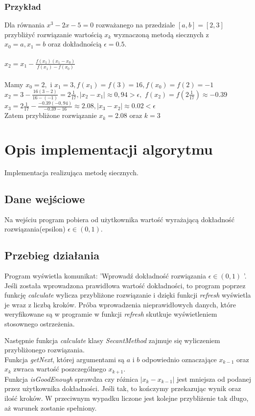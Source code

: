 \documentclass[12pt]{article}
\begin{document}
\subsubsection{Przykład}
Dla równania $x^3-2x-5=0$ rozważanego na przedziale $[a,b]=[2,3]$ przybliżyć rozwiązanie wartością $x_k$ wyznaczoną metodą siecznych z\\
$x_0=a, x_1=b$ oraz dokładnością $\epsilon = 0.5.$
\\ \\
$ x_2=x_1 - \frac{f(x_1)(x_1-x_{0})}{f(x_1)-f(x_{0})}$
\\ \\
 Mamy $ x_{0}=2,$ i $x_{1}=3, f(x_1)=f(3)=16, f(x_0)=f(2)=-1$ 
\\$x_2=3-\frac{16(3-2)}{16-(-1)}=2 \frac{1}{17}, |x_2 - x_1|\approx 0,94 > \epsilon,$
$f(x_2)=f(2 \frac{1}{17})\approx-0.39$ $x_3=2 \frac{1}{17}-\frac{-0.39(-0,94)}{-0.39-16}\approx2.08, |x_3 - x_2|\approx 0.02<\epsilon$
\\Zatem przybliżone rozwiązanie $x_k=2.08$ oraz $k=3$
\section{Opis implementacji algorytmu}
Implementacja realizująca metodę siecznych.
\subsection{Dane wejściowe}
Na wejściu program pobiera od użytkownika wartość wyrażającą dokładność rozwiązania(epsilon) $\epsilon \in(0,1).$ 



\subsection{Przebieg działania}
Program wyświetla komunikat: 'Wprowadź dokładność rozwiązania $\epsilon \in(0,1)$ '. Jeśli została wprowadzona prawidłowa wartość dokładności, to program poprzez funkcję \emph{calculate} wylicza przybliżone rozwiązanie i dzięki funkcji \emph{refresh} wyświetla je wraz z liczbą kroków.
Próba wprowadzenia nieprawidłowych danych, które weryfikowane są w programie w funkcji \emph{refresh} skutkuje wyświetleniem stosownego ostrzeżenia.
\par Następnie funkcja \emph{calculate} klasy \emph{SecantMethod} zajmuje się wyliczeniem przybliżonego rozwiązania.\\
Funkcja \emph{getNext}, której argumentami są $a$ i $b$ odpowiednio oznaczające $x_{k-1}$ oraz $x_{k}$ zwraca wartość poszczególnego $x_{k+1}$.
\\
Funkcja \emph{isGoodEnough} sprawdza czy różnica  $|x_k - x_{k-1}|$ jest mniejsza od podanej przez użytkownika dokładności. Jeśli tak, to kończymy przekazując wynik oraz ilość kroków. W przeciwnym wypadku liczone jest kolejne przybliżenie tak długo, aż warunek zostanie spełniony.
\end{document}
